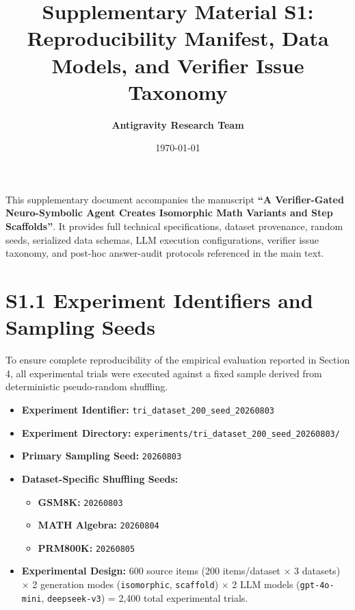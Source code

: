 \documentclass[11pt,letterpaper]{article}
\title{\textbf{Supplementary Material S1: Reproducibility Manifest, Data Models, and Verifier Issue Taxonomy}}
\author{\textbf{Antigravity Research Team}}
\date{\today}
\begin{document}
\maketitle

This supplementary document accompanies the manuscript \textbf{``A Verifier-Gated Neuro-Symbolic Agent Creates Isomorphic Math Variants and Step Scaffolds''}. It provides full technical specifications, dataset provenance, random seeds, serialized data schemas, LLM execution configurations, verifier issue taxonomy, and post-hoc answer-audit protocols referenced in the main text.

\tableofcontents
\newpage

\section{S1.1 Experiment Identifiers and Sampling Seeds}\label{sec:s11-experiment-identifiers}

To ensure complete reproducibility of the empirical evaluation reported in Section 4, all experimental trials were executed against a fixed sample derived from deterministic pseudo-random shuffling.

\begin{itemize}
    \item \textbf{Experiment Identifier:} \texttt{tri\_dataset\_200\_seed\_20260803}
    \item \textbf{Experiment Directory:} \texttt{experiments/tri\_dataset\_200\_seed\_20260803/}
    \item \textbf{Primary Sampling Seed:} \texttt{20260803}
    \item \textbf{Dataset-Specific Shuffling Seeds:}
    \begin{itemize}
        \item \textbf{GSM8K:} \texttt{20260803}
        \item \textbf{MATH Algebra:} \texttt{20260804}
        \item \textbf{PRM800K:} \texttt{20260805}
    \end{itemize}
    \item \textbf{Experimental Design:} 600 source items (200 items/dataset $\times$ 3 datasets) $\times$ 2 generation modes (\texttt{isomorphic}, \texttt{scaffold}) $\times$ 2 LLM models (\texttt{gpt-4o-mini}, \texttt{deepseek-v3}) = 2,400 total experimental trials.
\end{itemize}
\end{document}
